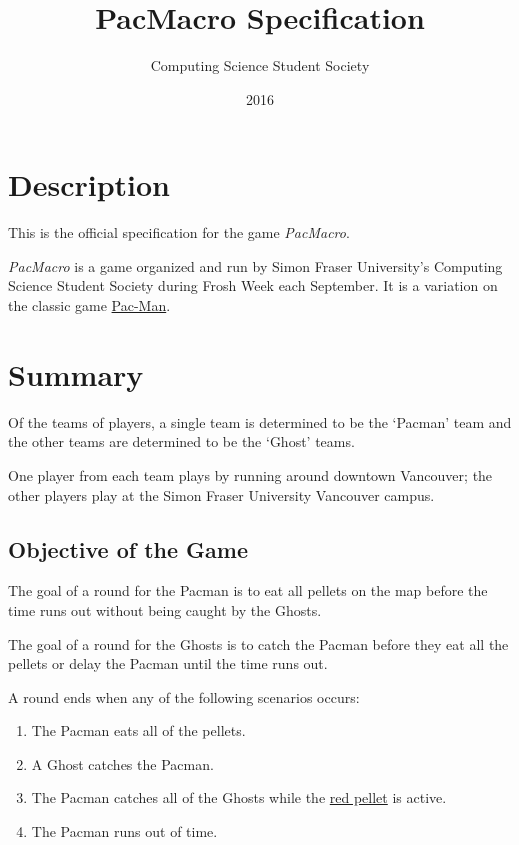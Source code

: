 \documentclass[10pt, oneside, letterpaper, titlepage]{article}
\title{PacMacro Specification}
\author{Computing Science Student Society}
\date{2016}
\begin{document}
	\maketitle
	\clearpage
	\tableofcontents
	\clearpage

	\section{Description}
	\label{sec:description}

	This is the official specification for the game \emph{PacMacro}.

	\emph{PacMacro} is a game organized and run by Simon Fraser University's Computing Science Student Society during Frosh Week each September. It is a variation on the classic game \href{https://en.wikipedia.org/wiki/Pac-Man}{Pac-Man}.

	\section{Summary}
	\label{sec:summary}

	Of the teams of players, a single team is determined to be the `Pacman' team and the other teams are determined to be the `Ghost' teams.

	One player from each team plays by running around downtown Vancouver; the other players play at the Simon Fraser University Vancouver campus.

	\subsection{Objective of the Game}
	\label{subsec:summary:objective-of-the-game}

	The goal of a round for the Pacman is to eat all pellets on the map before the time runs out without being caught by the Ghosts.

	The goal of a round for the Ghosts is to catch the Pacman before they eat all the pellets or delay the Pacman until the time runs out.

	A round ends when any of the following scenarios occurs:
	\begin{enumerate}
		\item The Pacman eats all of the pellets.
		\item A Ghost catches the Pacman.
		\item The Pacman catches all of the Ghosts while the \hyperref[subsec:gameplay:formal-rules]{red pellet} is active.
		\item The Pacman runs out of time.
	\end{enumerate}
\end{document}

